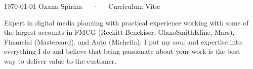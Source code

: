 \documentclass[11pt, a4paper]{awesome-cv}
\begin{document}
\makecvheader[C]

\makecvfooter
  {\today}
  {Oxana Spirina~~~·~~~Curriculum Vitæ}
  {\thepage}


%
%
%
%
%
%
%
%


\begin{cvparagraph}
	Expert in digital media planning with practical experience working with some of the largest accounts in FMCG (Reckitt Benckiser, GlaxoSmithKline, Mars), Financial (Mastercard), and Auto (Michelin). I put my soul and expertise into everything I do and believe that being passionate about your work is the best way to deliver value to the customer.
\end{cvparagraph}
\end{document}
